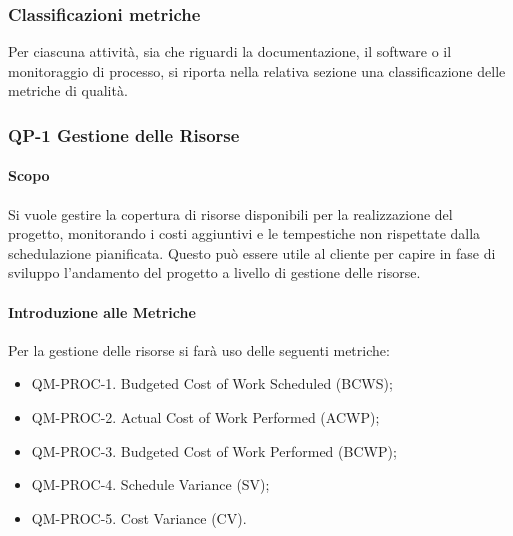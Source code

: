 



	\subsubsection{Classificazioni metriche} %

	Per ciascuna attività, sia che riguardi la documentazione, il software o il monitoraggio di processo, si riporta nella relativa sezione una classificazione delle metriche di qualità.

	\subsubsection{QP-1 Gestione delle Risorse}

		\paragraph{Scopo}

		Si vuole gestire la copertura di risorse disponibili per la realizzazione del progetto, monitorando i costi aggiuntivi e le tempestiche non rispettate dalla schedulazione pianificata. Questo può essere utile al cliente per capire in fase di sviluppo l'andamento del progetto a livello di gestione delle risorse.

		\paragraph{Introduzione alle Metriche}

		Per la gestione delle risorse si farà uso delle seguenti metriche:

		\begin{itemize}
			\item QM-PROC-1. Budgeted Cost of Work Scheduled (BCWS);
			\item QM-PROC-2. Actual Cost of Work Performed (ACWP);
			\item QM-PROC-3. Budgeted Cost of Work Performed (BCWP);
			\item QM-PROC-4. Schedule Variance (SV);
			\item QM-PROC-5. Cost Variance (CV).
		\end{itemize}

